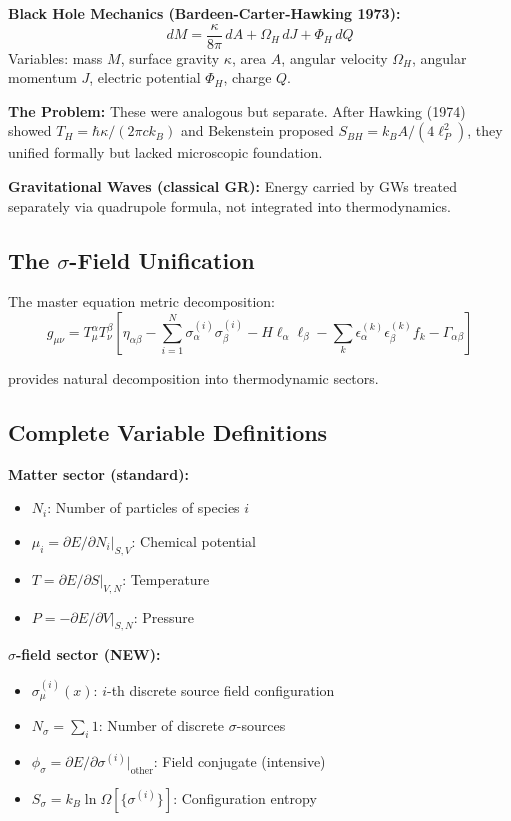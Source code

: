 \documentclass[11pt,a4paper]{article}
\theoremstyle{definition}
\theoremstyle{remark}
\begin{document}
	\textbf{Black Hole Mechanics (Bardeen-Carter-Hawking 1973):}
	\begin{equation}
		\boxed{dM = \frac{\kappa}{8\pi}\,dA + \Omega_H\,dJ + \Phi_H\,dQ}
	\end{equation}
	Variables: mass $M$, surface gravity $\kappa$, area $A$, angular velocity $\Omega_H$, angular momentum $J$, electric potential $\Phi_H$, charge $Q$.
	
	\textbf{The Problem:} These were analogous but separate. After Hawking (1974) showed $T_H = \hbar\kappa/(2\pi ck_B)$ and Bekenstein proposed $S_{BH} = k_B A/(4\ell_P^2)$, they unified formally but lacked microscopic foundation.
	
	\textbf{Gravitational Waves (classical GR):}
	Energy carried by GWs treated separately via quadrupole formula, not integrated into thermodynamics.
	
	\subsection{The $\sigma$-Field Unification}
	
	The master equation metric decomposition:
	\begin{equation}
		g_{\mu\nu} = T^\alpha_\mu T^\beta_\nu \left[\eta_{\alpha\beta} - \sum_{i=1}^N \sigma_\alpha^{(i)} \sigma_\beta^{(i)} - H\ell_\alpha\ell_\beta - \sum_k \epsilon_\alpha^{(k)}\epsilon_\beta^{(k)} f_k - \Gamma_{\alpha\beta}\right]
	\end{equation}
	
	provides natural decomposition into thermodynamic sectors.
	
	\subsection{Complete Variable Definitions}
	
	\textbf{Matter sector (standard):}
	\begin{itemize}
		\item $N_i$: Number of particles of species $i$
		\item $\mu_i = \partial E/\partial N_i|_{S,V}$: Chemical potential
		\item $T = \partial E/\partial S|_{V,N}$: Temperature
		\item $P = -\partial E/\partial V|_{S,N}$: Pressure
	\end{itemize}
	
	\textbf{$\sigma$-field sector (NEW):}
	\begin{itemize}
		\item $\sigma^{(i)}_\mu(x)$: $i$-th discrete source field configuration
		\item $N_\sigma = \sum_i 1$: Number of discrete $\sigma$-sources
		\item $\phi_\sigma = \partial E/\partial \sigma^{(i)}|_{\text{other}}$: Field conjugate (intensive)
		\item $S_\sigma = k_B \ln \Omega[\{\sigma^{(i)}\}]$: Configuration entropy
	\end{itemize}
	
\end{document}
